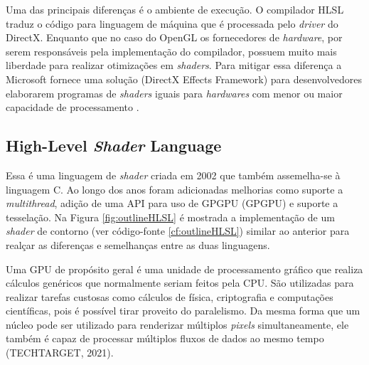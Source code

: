 Uma das principais diferenças é o ambiente de execução. O compilador HLSL traduz o código para linguagem de máquina que é processada pelo \textit{driver} do DirectX. Enquanto que no caso do OpenGL os fornecedores de \textit{hardware}, por serem responsáveis pela implementação do compilador, possuem muito mais liberdade para realizar otimizações em \textit{shaders}. Para mitigar essa diferença a Microsoft fornece uma solução (DirectX Effects Framework) para desenvolvedores elaborarem programas de \textit{shaders} iguais para \textit{hardwares} com menor ou maior capacidade de processamento \cite{GLSLBook}.

\subsection{High-Level \textit{Shader} Language}
\label{sec:hlsl}

Essa é uma linguagem de \textit{shader} criada em 2002 que também assemelha-se à linguagem C. Ao longo dos anos foram adicionadas melhorias como suporte a \textit{\Gls{multithread}}, adição de uma API para uso de GPGPU (\acrlong{GPGPU}) e suporte a tesselação. Na Figura \ref{fig:outlineHLSL} é mostrada a implementação de um \textit{shader} de contorno (ver código-fonte \ref{cf:outlineHLSL}) similar ao anterior para realçar as diferenças e semelhanças entre as duas linguagens.

\begin{figure}[h!]
	\centering
\end{figure}

Uma GPU de propósito geral é uma unidade de processamento gráfico que realiza cálculos genéricos que normalmente seriam feitos pela CPU. São utilizadas para realizar tarefas custosas como cálculos de física, criptografia e computações científicas, pois é possível tirar proveito do paralelismo. Da mesma forma que um núcleo pode ser utilizado para renderizar múltiplos \textit{pixels} simultaneamente, ele também é capaz de processar múltiplos fluxos de dados ao mesmo tempo (TECHTARGET, 2021)\nocite{GPGPU}.

